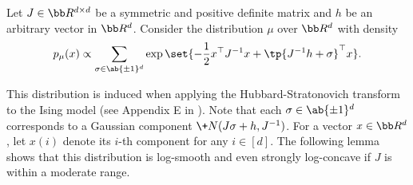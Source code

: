 Let $J\in \bb R^{d\times d}$ be a symmetric and positive definite matrix and $h$ be an arbitrary vector in $\bb R^d$. Consider the distribution $\mu$ over $\bb R^d$ with density
\begin{equation}
    p_{\mu}(x) \propto \sum_{\sigma\in \ab\{\pm 1\}^d} \exp\set{ - \frac{1}{2}x^{\top}J^{-1}x + \tp{J^{-1}h+\sigma}^{\top}x}. \label{eq:HS-mix}
\end{equation}

This distribution is induced when applying the Hubbard-Stratonovich transform to the Ising model (see Appendix E in \cite{KLR22}). 
Note that each $\sigma\in  \ab\{\pm 1\}^d$ corresponds to a Gaussian component $\+N(J\sigma+h, J^{-1})$. For a vector $x\in \bb R^d$, let $x(i)$ denote its $i$-th component for any $i\in[d]$. The following lemma shows that this distribution is log-smooth and even strongly log-concave if $J$ is within a moderate range.

